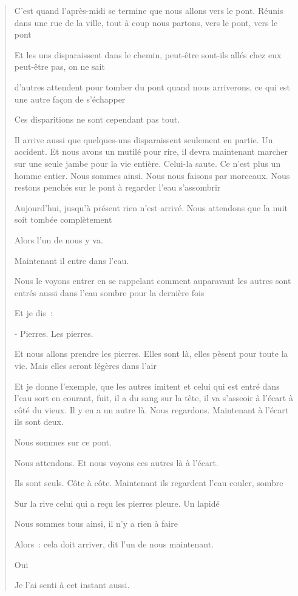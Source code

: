 \begin{quote}
C'est quand l'après-midi se termine que nous allons vers le pont. Réunis
dans une rue de la ville, tout à coup nous partons, vers le pont, vers
le pont

Et les uns disparaissent dans le chemin, peut-être sont-ils allés chez
eux peut-être pas, on ne sait

d'autres attendent pour tomber du pont quand nous arriverons, ce qui est
une autre façon de s'échapper

Ces disparitions ne sont cependant pas tout.

Il arrive aussi que quelques-uns disparaissent seulement en partie. Un
accident. Et nous avons un mutilé pour rire, il devra maintenant marcher
sur une seule jambe pour la vie entière. Celui-la saute. Ce n'est plus
un homme entier. Nous sommes ainsi. Nous nous faisons par morceaux. Nous
restons penchés sur le pont à regarder l'eau s'assombrir

Aujourd'hui, jusqu'à présent rien n'est arrivé. Nous attendons que la
nuit soit tombée complètement

Alors l'un de nous y va.

Maintenant il entre dans l'eau.

Nous le voyons entrer en se rappelant comment auparavant les autres sont
entrés aussi dans l'eau sombre pour la dernière fois

Et je dis~:

- Pierres. Les pierres.

Et nous allons prendre les pierres. Elles sont là, elles pèsent pour
toute la vie. Mais elles seront légères dans l'air

Et je donne l'exemple, que les autres imitent et celui qui est entré
dans l'eau sort en courant, fuit, il a du sang sur la tête, il va
s'asseoir à l'écart à côté du vieux. Il y en a un autre là. Nous
regardons. Maintenant à l'écart ils sont deux.

Nous sommes sur ce pont.

Nous attendons. Et nous voyons ces autres là à l'écart.

Ils sont seuls. Côte à côte. Maintenant ils regardent l'eau couler,
sombre

Sur la rive celui qui a reçu les pierres pleure. Un lapidé

Nous sommes tous ainsi, il n'y a rien à faire

Alors~: cela doit arriver, dit l'un de nous maintenant.

Oui

Je l'ai senti à cet instant aussi.


\end{quote}
